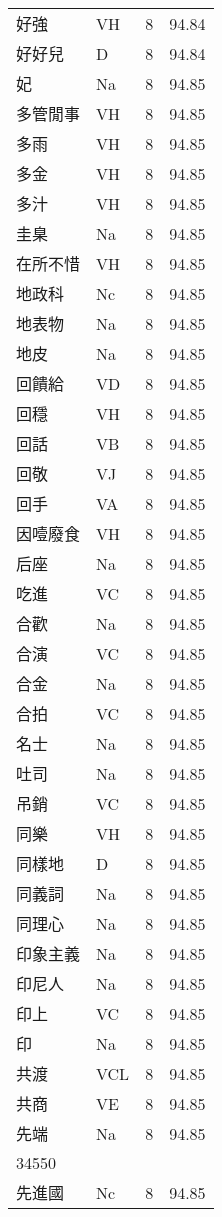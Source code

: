 \documentclass[twocolumn]{book}
\begin{document}
\begin{supertabular}{llrr}
好強 & VH & 8 &  94.84\\
好好兒 & D & 8 &  94.84\\
妃 & Na & 8 &  94.85\\
多管閒事 & VH & 8 &  94.85\\
多雨 & VH & 8 &  94.85\\
多金 & VH & 8 &  94.85\\
多汁 & VH & 8 &  94.85\\
圭臬 & Na & 8 &  94.85\\
在所不惜 & VH & 8 &  94.85\\
地政科 & Nc & 8 &  94.85\\
地表物 & Na & 8 &  94.85\\
地皮 & Na & 8 &  94.85\\
回饋給 & VD & 8 &  94.85\\
回穩 & VH & 8 &  94.85\\
回話 & VB & 8 &  94.85\\
回敬 & VJ & 8 &  94.85\\
回手 & VA & 8 &  94.85\\
因噎廢食 & VH & 8 &  94.85\\
后座 & Na & 8 &  94.85\\
吃進 & VC & 8 &  94.85\\
合歡 & Na & 8 &  94.85\\
合演 & VC & 8 &  94.85\\
合金 & Na & 8 &  94.85\\
合拍 & VC & 8 &  94.85\\
名士 & Na & 8 &  94.85\\
吐司 & Na & 8 &  94.85\\
吊銷 & VC & 8 &  94.85\\
同樂 & VH & 8 &  94.85\\
同樣地 & D & 8 &  94.85\\
同義詞 & Na & 8 &  94.85\\
同理心 & Na & 8 &  94.85\\
印象主義 & Na & 8 &  94.85\\
印尼人 & Na & 8 &  94.85\\
印上 & VC & 8 &  94.85\\
印 & Na & 8 &  94.85\\
共渡 & VCL & 8 &  94.85\\
共商 & VE & 8 &  94.85\\
先端 & Na & 8 &  94.85\\
34550\\
先進國 & Nc & 8 &  94.85\\

\end{supertabular}
\end{document}
